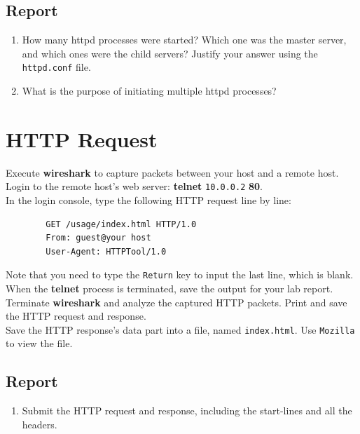 \documentclass[10pt,a4paper]{article}
\numberwithin{equation}{section}
\numberwithin{figure}{section}
\numberwithin{table}{section}
\begin{document}
    \subsection*{Report}
    \begin{enumerate}
        \item How many httpd processes were started?
        Which one was the master server, and which ones were the child servers?
        Justify your answer using the \texttt{httpd.conf} file. \\
        \item What is the purpose of initiating multiple httpd processes? \\
    \end{enumerate}

    \section*{HTTP Request}
    Execute \textbf{wireshark} to capture packets between your host and a remote host. \\
    Login to the remote host’s web server: \textbf{telnet} \texttt{10.0.0.2} \textbf{80}. \\
    In the login console, type the following HTTP request line by line: \\
    \begin{verbatim}
        GET /usage/index.html HTTP/1.0
        From: guest@your host
        User-Agent: HTTPTool/1.0
    \end{verbatim}
    Note that you need to type the \texttt{Return} key to input the last line, which is blank.
    When the \textbf{telnet} process is terminated, save the output for your lab report. \\
    Terminate \textbf{wireshark} and analyze the captured HTTP packets.
    Print and save the HTTP request and response. \\
    Save the HTTP response’s data part into a file, named \texttt{index.html}.
    Use \texttt{Mozilla} to view the file.
    \subsection*{Report}
    \begin{enumerate}
        \item Submit the HTTP request and response, including the start-lines and all the headers.
    \end{enumerate}

\end{document}
